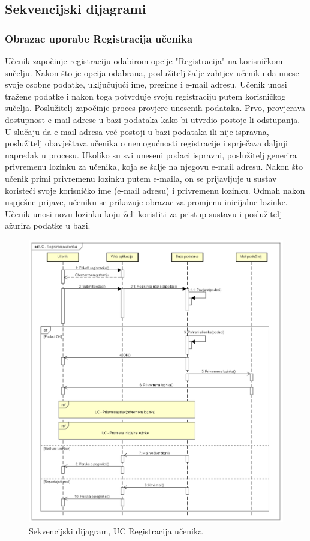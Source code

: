 \subsection{Sekvencijski dijagrami}

\subsubsection{{Obrazac uporabe Registracija učenika}}


Učenik započinje registraciju odabirom opcije "Registracija" na korisničkom sučelju. Nakon što je opcija odabrana, poslužitelj šalje zahtjev učeniku da unese svoje osobne podatke, uključujući ime, prezime i e-mail adresu. Učenik unosi tražene podatke i nakon toga potvrđuje svoju registraciju putem korisničkog sučelja. Poslužitelj započinje proces provjere unesenih podataka. Prvo, provjerava dostupnost e-mail adrese u bazi podataka kako bi utvrdio postoje li odstupanja. U slučaju da e-mail adresa već postoji u bazi podataka ili nije ispravna, poslužitelj obavještava učenika o nemogućnosti registracije i sprječava daljnji napredak u procesu. Ukoliko su svi uneseni podaci ispravni, poslužitelj generira privremenu lozinku za učenika, koja se šalje na njegovu e-mail adresu. Nakon što učenik primi privremenu lozinku putem e-maila, on se prijavljuje u sustav koristeći svoje korisničko ime (e-mail adresu) i privremenu lozinku. Odmah nakon uspješne prijave, učeniku se prikazuje obrazac za promjenu inicijalne lozinke. Učenik unosi novu lozinku koju želi koristiti za pristup sustavu i poslužitelj ažurira podatke u bazi.

\begin{figure}[htp]
	\includegraphics[scale=0.45]{dijagrami/UC - Registracija ucenika.png} 
	\centering
	\caption{Sekvencijski dijagram, UC Registracija učenika}
	\label{fig:uc-registracija}
\end{figure}

